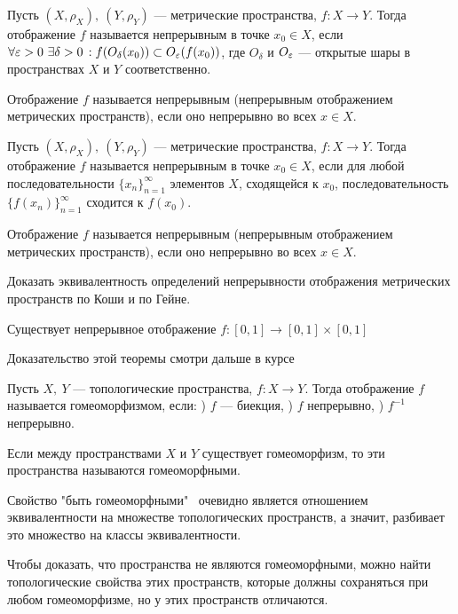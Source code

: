 \begin{definition}
    Пусть $(X, \rho_{X}), \ (Y, \rho_{Y})$ --- метрические пространства, $f: X \rightarrow Y$. Тогда отображение $f$ называется непрерывным в точке $x_0 \in X$,
    если $\forall \varepsilon > 0 \ \exists \delta > 0 \, : f(O_{\delta}(x_0)) \subset O_{\varepsilon}(f(x_0))$, где $O_{\delta}$ и $O_{\varepsilon}$ --- открытые шары в пространствах $X$ и $Y$ соответственно. 

    Отображение $f$ называется непрерывным (непрерывным отображением метрических пространств), если оно непрерывно во всех $x \in X$.
\end{definition}
\begin{definition}
    Пусть $(X, \rho_{X}), \ (Y, \rho_{Y})$ --- метрические пространства, $f: X \rightarrow Y$. Тогда отображение $f$ называется непрерывным в точке $x_0 \in X$,
    если для любой последовательности $\{x_n\}_{n = 1}^{\infty}$ элементов $X$, сходящейся к $x_0$, последовательность $\{f(x_n)\}_{n = 1}^{\infty}$ сходится к $f(x_0)$.

    Отображение $f$ называется непрерывным (непрерывным отображением метрических пространств), если оно непрерывно во всех $x \in X$.
\end{definition}

\begin{exercise}
    Доказать эквивалентность определений непрерывности отображения метрических пространств по Коши и по Гейне.
\end{exercise}

\begin{theorem}
    Существует непрерывное отображение $f: [0, 1] \rightarrow [0, 1] \times [0, 1]$
\end{theorem}
Доказательство этой теоремы смотри дальше в курсе %

\begin{definition}
    Пусть $X, \ Y$ --- топологические пространства, $f: X \rightarrow Y$. Тогда отображение $f$ называется гомеоморфизмом, если: ) $f$ --- биекция, ) $f$ непрерывно, ) $f^{-1}$ непрерывно.

    Если между пространствами $X$ и $Y$ существует гомеоморфизм, то эти пространства называются гомеоморфными.
\end{definition}

\begin{nota_bene}
    Свойство "быть гомеоморфными" \, очевидно является отношением эквивалентности на множестве топологических пространств, а значит, разбивает это множество на классы эквивалентности.

    Чтобы доказать, что пространства не являются гомеоморфными, можно найти топологические свойства этих пространств, которые должны сохраняться при любом гомеоморфизме, но у этих пространств отличаются. 
\end{nota_bene}

